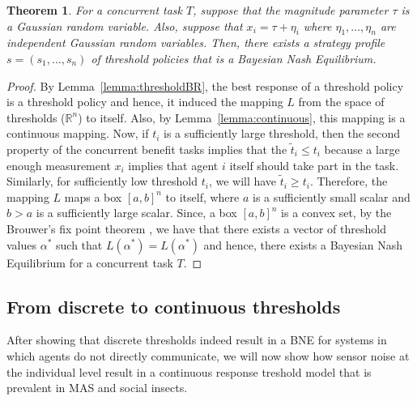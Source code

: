 \documentclass[conference]{ieeeconf}
\newtheorem{theorem}{Theorem}
\def\R{\mathbb{R}}
\begin{document}
\begin{theorem}\label{thrm:mainthrm}
For a concurrent task $T$, suppose that the magnitude parameter $\tau$ is a Gaussian random variable. Also, suppose that $x_i=\tau+\eta_i$ where $\eta_1,\ldots,\eta_n$ are independent Gaussian random variables. Then, there exists a strategy profile $s=(s_1,\ldots,s_n)$ of threshold policies that is a Bayesian Nash Equilibrium.
\end{theorem}
\begin{proof}
By Lemma~\ref{lemma:thresholdBR}, the best response of a threshold policy is a threshold policy and hence, it induced the mapping $L$ from the space of thresholds ($\R^n$) to itself. Also, by Lemma~\ref{lemma:continuous}, this mapping is a continuous mapping. Now, if $t_i$ is a sufficiently large threshold, then the second property of the concurrent benefit tasks implies that the $\tilde{t}_i\leq t_i$ because a large enough measurement $x_i$ implies that agent $i$ itself should take part in the task. Similarly, for sufficiently low threshold $t_i$, we will have $\tilde{t}_i\geq t_i$. Therefore, the mapping $L$ maps a box $[a,b]^n$ to itself, where $a$ is a sufficiently small scalar and $b>a$ is a sufficiently large scalar. Since, a box $[a,b]^n$ is a convex set, by the Brouwer's fix point theorem \cite{border1990fixed}, we have that there exists a vector of threshold values $\alpha^*$ such that $L(\alpha^*)=L(\alpha^*)$ and hence, there exists a Bayesian Nash Equilibrium for a concurrent task $T$.
\end{proof}


\subsection{From discrete to continuous thresholds}\label{subsec:sigfun}
After showing that discrete thresholds indeed result in a BNE for systems in which agents do not directly communicate, we will now show how sensor noise at the individual level result in a continuous response treshold model that is prevalent in MAS and social insects. 
\end{document}
